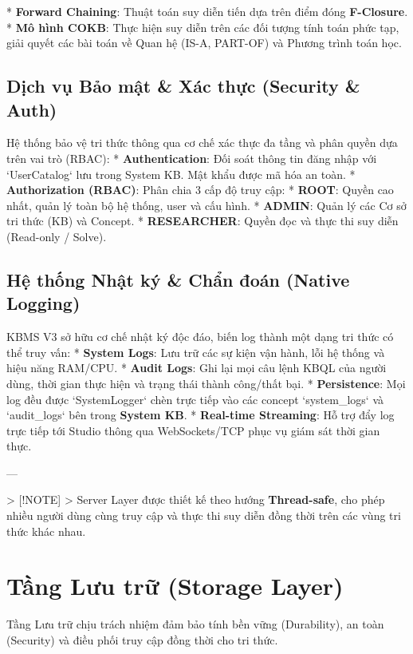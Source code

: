 *   \textbf{Forward Chaining}: Thuật toán suy diễn tiến dựa trên điểm đóng \textbf{F-Closure}.
*   \textbf{Mô hình COKB}: Thực hiện suy diễn trên các đối tượng tính toán phức tạp, giải quyết các bài toán về Quan hệ (IS-A, PART-OF) và Phương trình toán học.

\subsection{Dịch vụ Bảo mật & Xác thực (Security & Auth)}

Hệ thống bảo vệ tri thức thông qua cơ chế xác thực đa tầng và phân quyền dựa trên vai trò (RBAC):
*   \textbf{Authentication}: Đối soát thông tin đăng nhập với `UserCatalog` lưu trong System KB. Mật khẩu được mã hóa an toàn.
*   \textbf{Authorization (RBAC)}: Phân chia 3 cấp độ truy cập:
    *   \textbf{ROOT}: Quyền cao nhất, quản lý toàn bộ hệ thống, user và cấu hình.
    *   \textbf{ADMIN}: Quản lý các Cơ sở tri thức (KB) và Concept.
    *   \textbf{RESEARCHER}: Quyền đọc và thực thi suy diễn (Read-only / Solve).

\subsection{Hệ thống Nhật ký & Chẩn đoán (Native Logging)}

KBMS V3 sở hữu cơ chế nhật ký độc đáo, biến log thành một dạng tri thức có thể truy vấn:
*   \textbf{System Logs}: Lưu trữ các sự kiện vận hành, lỗi hệ thống và hiệu năng RAM/CPU.
*   \textbf{Audit Logs}: Ghi lại mọi câu lệnh KBQL của người dùng, thời gian thực hiện và trạng thái thành công/thất bại.
*   \textbf{Persistence}: Mọi log đều được `SystemLogger` chèn trực tiếp vào các concept `system\_logs` và `audit\_logs` bên trong \textbf{System KB}.
*   \textbf{Real-time Streaming}: Hỗ trợ đẩy log trực tiếp tới Studio thông qua WebSockets/TCP phục vụ giám sát thời gian thực.

---

> [!NOTE]
> Server Layer được thiết kế theo hướng \textbf{Thread-safe}, cho phép nhiều người dùng cùng truy cập và thực thi suy diễn đồng thời trên các vùng tri thức khác nhau.

\section{Tầng Lưu trữ (Storage Layer)}

Tầng Lưu trữ chịu trách nhiệm đảm bảo tính bền vững (Durability), an toàn (Security) và điều phối truy cập đồng thời cho tri thức.

